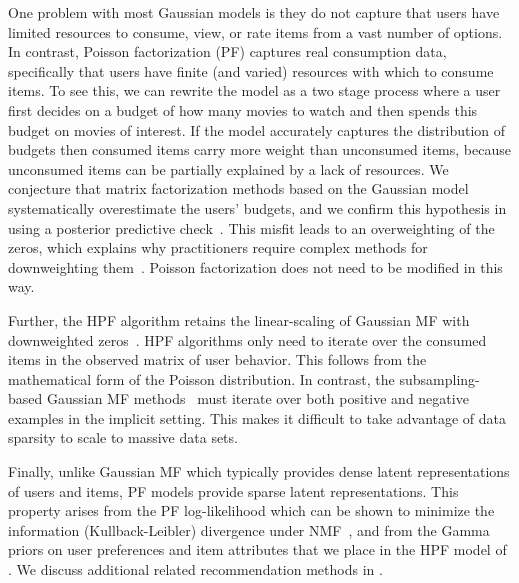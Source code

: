 One problem with most Gaussian models is they do not capture that
users have limited resources to consume, view, or rate items from a
vast number of options. 
In contrast, Poisson factorization (PF) captures real consumption
data, specifically that users have finite (and varied) resources with
which to consume items.  To see this, we can rewrite the model as a
two stage process where a user first decides on a budget of how many
movies to watch and then spends this budget on movies of interest. If
the model accurately captures the distribution of budgets then
consumed items carry more weight than unconsumed items, because
unconsumed items can be partially explained by a lack of resources. We
conjecture that matrix factorization methods based on the Gaussian
model systematically overestimate the users' budgets, and we confirm
this hypothesis in  using a posterior predictive
check~\cite{Gelman:1996}. This misfit leads to an overweighting of the
zeros, which explains why practitioners require complex methods for
downweighting
them~\cite{Hu:2008p9402,Gantner:2012p9364,Dror:2012a,Paquet:2013p9197}.
Poisson factorization does not need to be modified in this way.

Further, the HPF algorithm retains the linear-scaling of Gaussian MF
with downweighted zeros~\cite{Hu:2008p9402}. HPF algorithms only need
to iterate over the consumed items in the observed matrix of user
behavior. This follows from the mathematical form of the Poisson
distribution.  In contrast, the subsampling-based Gaussian MF
methods~\cite{Gantner:2012p9364, Dror:2012a,Paquet:2013p9197} must
iterate over both positive and negative examples in the implicit
setting. This makes it difficult to take advantage of data sparsity to
scale to massive data sets.

Finally, unlike Gaussian MF which typically provides dense latent
representations of users and items, PF models provide sparse latent
representations. This property arises from the PF log-likelihood which
can be shown to minimize the information (Kullback-Leibler) divergence
under NMF~\cite{Cemgil:2009}, and from the Gamma priors on user
preferences and item attributes that we place in the HPF model of
. We discuss additional related recommendation methods
in .




